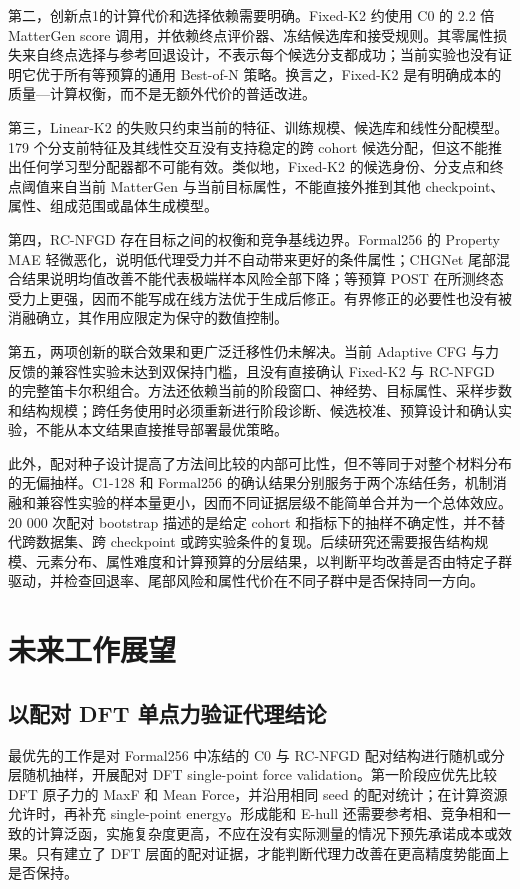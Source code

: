 第二，创新点1的计算代价和选择依赖需要明确。Fixed-K2 约使用 C0 的 2.2 倍 MatterGen score 调用，并依赖终点评价器、冻结候选库和接受规则。其零属性损失来自终点选择与参考回退设计，不表示每个候选分支都成功；当前实验也没有证明它优于所有等预算的通用 Best-of-N 策略。换言之，Fixed-K2 是有明确成本的质量---计算权衡，而不是无额外代价的普适改进。

第三，Linear-K2 的失败只约束当前的特征、训练规模、候选库和线性分配模型。179 个分支前特征及其线性交互没有支持稳定的跨 cohort 候选分配，但这不能推出任何学习型分配器都不可能有效。类似地，Fixed-K2 的候选身份、分支点和终点阈值来自当前 MatterGen 与当前目标属性，不能直接外推到其他 checkpoint、属性、组成范围或晶体生成模型。

第四，RC-NFGD 存在目标之间的权衡和竞争基线边界。Formal256 的 Property MAE 轻微恶化，说明低代理受力并不自动带来更好的条件属性；CHGNet 尾部混合结果说明均值改善不能代表极端样本风险全部下降；等预算 POST 在所测终态受力上更强，因而不能写成在线方法优于生成后修正。有界修正的必要性也没有被消融确立，其作用应限定为保守的数值控制。

第五，两项创新的联合效果和更广泛迁移性仍未解决。当前 Adaptive CFG 与力反馈的兼容性实验未达到双保持门槛，且没有直接确认 Fixed-K2 与 RC-NFGD 的完整笛卡尔积组合。方法还依赖当前的阶段窗口、神经势、目标属性、采样步数和结构规模；跨任务使用时必须重新进行阶段诊断、候选校准、预算设计和确认实验，不能从本文结果直接推导部署最优策略。

此外，配对种子设计提高了方法间比较的内部可比性，但不等同于对整个材料分布的无偏抽样。C1-128 和 Formal256 的确认结果分别服务于两个冻结任务，机制消融和兼容性实验的样本量更小，因而不同证据层级不能简单合并为一个总体效应。20 000 次配对 bootstrap 描述的是给定 cohort 和指标下的抽样不确定性，并不替代跨数据集、跨 checkpoint 或跨实验条件的复现。后续研究还需要报告结构规模、元素分布、属性难度和计算预算的分层结果，以判断平均改善是否由特定子群驱动，并检查回退率、尾部风险和属性代价在不同子群中是否保持同一方向。

\section{未来工作展望}

\subsection{以配对 DFT 单点力验证代理结论}

最优先的工作是对 Formal256 中冻结的 C0 与 RC-NFGD 配对结构进行随机或分层随机抽样，开展配对 DFT single-point force validation。第一阶段应优先比较 DFT 原子力的 MaxF 和 Mean Force，并沿用相同 seed 的配对统计；在计算资源允许时，再补充 single-point energy。形成能和 E-hull 还需要参考相、竞争相和一致的计算泛函，实施复杂度更高，不应在没有实际测量的情况下预先承诺成本或效果。只有建立了 DFT 层面的配对证据，才能判断代理力改善在更高精度势能面上是否保持。

